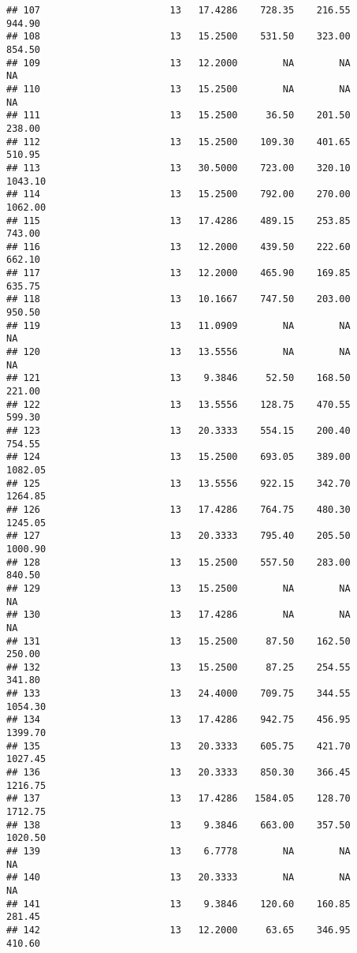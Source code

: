 \documentclass[]{article}
\begin{document}
\begin{verbatim}
## 107                       13   17.4286    728.35    216.55     944.90
## 108                       13   15.2500    531.50    323.00     854.50
## 109                       13   12.2000        NA        NA         NA
## 110                       13   15.2500        NA        NA         NA
## 111                       13   15.2500     36.50    201.50     238.00
## 112                       13   15.2500    109.30    401.65     510.95
## 113                       13   30.5000    723.00    320.10    1043.10
## 114                       13   15.2500    792.00    270.00    1062.00
## 115                       13   17.4286    489.15    253.85     743.00
## 116                       13   12.2000    439.50    222.60     662.10
## 117                       13   12.2000    465.90    169.85     635.75
## 118                       13   10.1667    747.50    203.00     950.50
## 119                       13   11.0909        NA        NA         NA
## 120                       13   13.5556        NA        NA         NA
## 121                       13    9.3846     52.50    168.50     221.00
## 122                       13   13.5556    128.75    470.55     599.30
## 123                       13   20.3333    554.15    200.40     754.55
## 124                       13   15.2500    693.05    389.00    1082.05
## 125                       13   13.5556    922.15    342.70    1264.85
## 126                       13   17.4286    764.75    480.30    1245.05
## 127                       13   20.3333    795.40    205.50    1000.90
## 128                       13   15.2500    557.50    283.00     840.50
## 129                       13   15.2500        NA        NA         NA
## 130                       13   17.4286        NA        NA         NA
## 131                       13   15.2500     87.50    162.50     250.00
## 132                       13   15.2500     87.25    254.55     341.80
## 133                       13   24.4000    709.75    344.55    1054.30
## 134                       13   17.4286    942.75    456.95    1399.70
## 135                       13   20.3333    605.75    421.70    1027.45
## 136                       13   20.3333    850.30    366.45    1216.75
## 137                       13   17.4286   1584.05    128.70    1712.75
## 138                       13    9.3846    663.00    357.50    1020.50
## 139                       13    6.7778        NA        NA         NA
## 140                       13   20.3333        NA        NA         NA
## 141                       13    9.3846    120.60    160.85     281.45
## 142                       13   12.2000     63.65    346.95     410.60

\end{verbatim}
\end{document}
